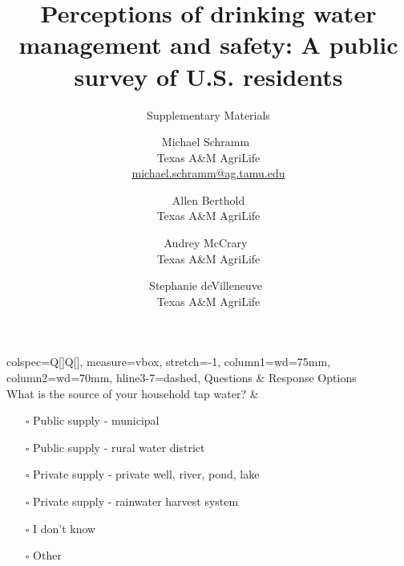 \documentclass[
]{article}
\title{Perceptions of drinking water management and safety: A public
survey of U.S. residents}
\subtitle{Supplementary Materials}
\author{
{\large Michael Schramm~\orcidlink{0000-0003-1876-6592}}%
 \\%
Texas A\&M AgriLife \\%
{\footnotesize \url{michael.schramm@ag.tamu.edu}} \and
{\large Allen Berthold}%
 \\%
Texas A\&M AgriLife \\%
{\footnotesize \url{}} \and
{\large Audrey McCrary~\orcidlink{0000-0002-7061-6113}}%
 \\%
Texas A\&M AgriLife \\%
{\footnotesize \url{}} \and
{\large Stephanie deVilleneuve~\orcidlink{0009-0002-3984-035X}}%
 \\%
Texas A\&M AgriLife \\%
{\footnotesize \url{}} \and
}
\date{}
\newcommand{\published}[1]{%
   \gdef\puB{#1}}
\newcommand{\puB}{}
\begin{document}
\published{\textbf{}}

\maketitle





\begin{longtblr}[         %
caption={},
entry=none,label=none,
note{1}={Matrix style question.},
label=tblr:quest,
caption={Survey questions.},
]                     %
{                     %
colspec={Q[]Q[]},
measure=vbox, stretch=-1, column{1}={wd=75mm}, column{2}={wd=70mm}, hline{3-7}={dashed},
}                     %
\toprule
Questions & Response Options \\ \midrule %
What is the source of your household tap water?                                                                                                                                                                                                                                                                                                                                                                                                                              & \begin{itemize}[nosep]    \item[$\square$] Public supply - municipal     \item[$\square$] Public supply - rural water district    \item[$\square$] Private supply - private well, river, pond, lake    \item[$\square$] Private supply - rainwater harvest system    \item[$\square$] I don't know    \item[$\square$] Other    \end{itemize}                                                                                                                                                                                                                                                                            \\

\end{longtblr}
\end{document}
